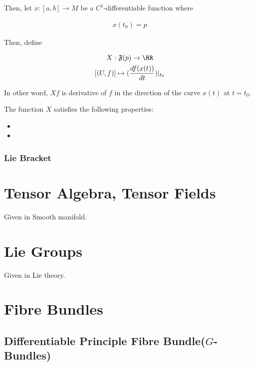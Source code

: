 \documentclass[Total.tex]{subfiles}
\begin{document}
						Then, let $x:[a,b]\rightarrow M$ be a $C^1$-differentiable function where
						
						\begin{gather*}
							x(t_0)=p
						\end{gather*}
						
						Then, define 
						
						\begin{gather*}
							X:\mathfrak{F}(p)\rightarrow \RR\\
							[(U,f)]\mapsto (\frac{df(x(t))}{dt})|_{t_0} 
						\end{gather*}
						
						In other word, $Xf$ is derivative of $f$ in the direction of the curve $x(t)$ at $t=t_0$. 
						
						The function $X$ satisfies the following properties:
						
						\begin{itemize}
							\item 
							\item 
						\end{itemize}
						
					\subsubsection{Lie Bracket}
					
		\section{Tensor Algebra, Tensor Fields}
			Given in Smooth manifold.
		\section{Lie Groups}
			Given in Lie theory.
		\section{Fibre Bundles}
			\subsection{Differentiable Principle Fibre Bundle($G$-Bundles)}
			
\end{document}
